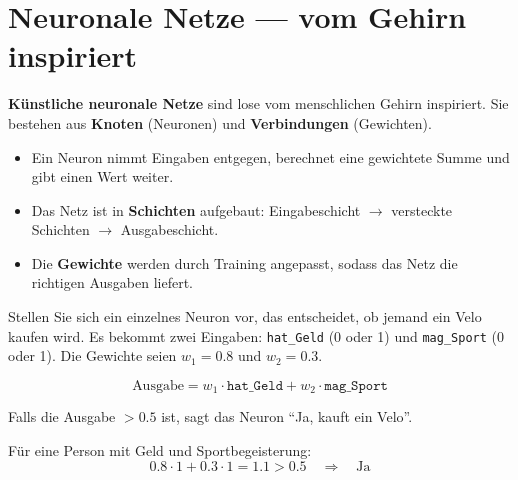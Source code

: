 \section{Neuronale Netze --- vom Gehirn inspiriert}

\begin{mydefinition}
\textbf{Künstliche neuronale Netze} sind lose vom menschlichen Gehirn inspiriert.
Sie bestehen aus \textbf{Knoten} (Neuronen) und \textbf{Verbindungen} (Gewichten).

\begin{itemize}
    \item Ein Neuron nimmt Eingaben entgegen, berechnet eine gewichtete Summe
          und gibt einen Wert weiter.
    \item Das Netz ist in \textbf{Schichten} aufgebaut:
          Eingabeschicht $\rightarrow$ versteckte Schichten $\rightarrow$ Ausgabeschicht.
    \item Die \textbf{Gewichte} werden durch Training angepasst, sodass das Netz
          die richtigen Ausgaben liefert.
\end{itemize}
\end{mydefinition}

\begin{myexample}
Stellen Sie sich ein einzelnes Neuron vor, das entscheidet, ob jemand ein Velo kaufen
wird. Es bekommt zwei Eingaben: \texttt{hat\_Geld} (0 oder 1) und
\texttt{mag\_Sport} (0 oder 1). Die Gewichte seien $w_1 = 0.8$ und $w_2 = 0.3$.

\[
    \text{Ausgabe} = w_1 \cdot \texttt{hat\_Geld} + w_2 \cdot \texttt{mag\_Sport}
\]

Falls die Ausgabe $> 0.5$ ist, sagt das Neuron \enquote{Ja, kauft ein Velo}.

Für eine Person mit Geld und Sportbegeisterung:
\[
    0.8 \cdot 1 + 0.3 \cdot 1 = 1.1 > 0.5 \quad \Rightarrow \quad \text{Ja}
\]
\end{myexample}

